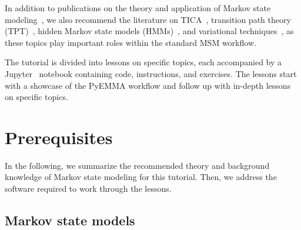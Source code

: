 \documentclass[9pt,tutorial]{livecoms}
\begin{document}
In addition to publications on the theory and application of Markov state modeling~\cite{schuette-msm,buchete-msm-2008,noe-tmat-sampling,bowman-msm-2009,noe-folding-pathways,sarich-msm-quality,noe-fingerprints,noe-dy-neut-scatt,Chodera2014,ben-rev-msm,simon-mech-mod-nmr,oom-feliks,simon-amm},
we also recommend the literature on TICA~\cite{tica,tica3,tica2,kinetic-maps},
transition path theory (TPT)~\cite{weinan-tpt,metzner-msm-tpt},
hidden Markov state models (HMMs)~\cite{noe-proj-hid-msm,hmm-baum-welch-alg,hmm-tutorial,jhp-spectral-rate-theory,bhmm-preprint},
and variational techniques~\cite{noe-vac,vamp-preprint,gmrq},
as these topics play important roles within the standard MSM workflow.

The tutorial is divided into lessons on specific topics, each accompanied by a Jupyter~\cite{jupyter} notebook containing code, instructions, and exercises.
The lessons start with a showcase of the PyEMMA workflow and follow up with in-depth lessons on specific topics.

\section{Prerequisites}

In the following, we summarize the recommended theory and background knowledge of Markov state modeling for this tutorial.
Then, we address the software required to work through the lessons.

\subsection{Markov state models}
\label{sec:theory}
\end{document}
